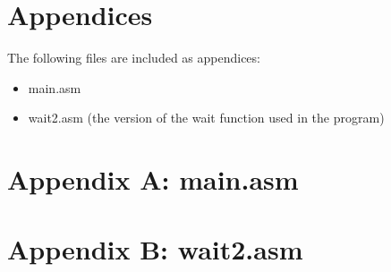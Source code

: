 \documentclass[letterpaper,11pt]{texMemo} %
\begin{document}
\section*{Appendices}
The following files are included as appendices:
\begin{itemize}
\item main.asm
\item wait2.asm (the version of the wait function used in the program)
\end{itemize}
\newpage

\section*{Appendix A: main.asm}
\begin{tiny}

\end{tiny}
\newpage
\section*{Appendix B: wait2.asm}
\begin{tiny}

\end{tiny}
\end{document}
